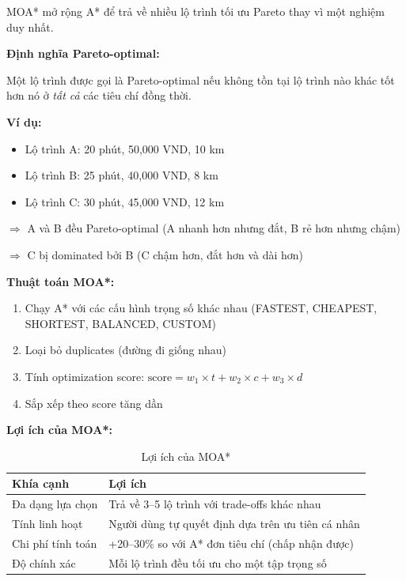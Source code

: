 MOA* mở rộng A* để trả về nhiều lộ trình tối ưu Pareto thay vì một nghiệm duy nhất.

\textbf{Định nghĩa Pareto-optimal:}

Một lộ trình được gọi là Pareto-optimal nếu không tồn tại lộ trình nào khác tốt hơn nó ở \textit{tất cả} các tiêu chí đồng thời.

\textbf{Ví dụ:}
\begin{itemize}
    \item Lộ trình A: 20 phút, 50,000 VND, 10 km
    \item Lộ trình B: 25 phút, 40,000 VND, 8 km
    \item Lộ trình C: 30 phút, 45,000 VND, 12 km
\end{itemize}

$\Rightarrow$ A và B đều Pareto-optimal (A nhanh hơn nhưng đắt, B rẻ hơn nhưng chậm)

$\Rightarrow$ C bị dominated bởi B (C chậm hơn, đắt hơn và dài hơn)

\textbf{Thuật toán MOA*:}

\begin{enumerate}
    \item Chạy A* với các cấu hình trọng số khác nhau (FASTEST, CHEAPEST, SHORTEST, BALANCED, CUSTOM)
    \item Loại bỏ duplicates (đường đi giống nhau)
    \item Tính optimization score: $\text{score} = w_1 \times t + w_2 \times c + w_3 \times d$
    \item Sắp xếp theo score tăng dần
\end{enumerate}

\textbf{Lợi ích của MOA*:}

\begin{table}[h]
\centering
\begin{tabular}{|l|p{8cm}|}
\hline
\textbf{Khía cạnh} & \textbf{Lợi ích} \\
\hline
Đa dạng lựa chọn & Trả về 3--5 lộ trình với trade-offs khác nhau \\
Tính linh hoạt & Người dùng tự quyết định dựa trên ưu tiên cá nhân \\
Chi phí tính toán & +20--30\% so với A* đơn tiêu chí (chấp nhận được) \\
Độ chính xác & Mỗi lộ trình đều tối ưu cho một tập trọng số \\
\hline
\end{tabular}
\caption{Lợi ích của MOA*}
\end{table}

